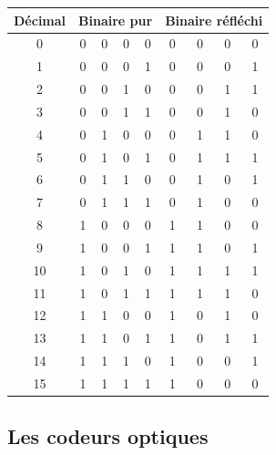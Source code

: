 \documentclass[10pt,fleqn]{article} %
\begin{document}
\begin{minipage}[c]{.4\linewidth}
\begin{center}
\begin{tabular}{|c|cccc|cccc|}
\hline
Décimal & \multicolumn{4}{c|}{Binaire pur} &\multicolumn{4}{c|}{Binaire réfléchi} \\
\hline
\hline
0 & 0 & 0 & 0 & 0 & 0 & 0 & 0 & 0 \\ \hline
1 & 0 & 0 & 0 & 1 & 0 & 0 & 0 & 1 \\ \hline\hline
2 & 0 & 0 & 1 & 0 & 0 & 0 & 1 & 1 \\ \hline
3 & 0 & 0 & 1 & 1 & 0 & 0 & 1 & 0 \\ \hline\hline
4 & 0 & 1 & 0 & 0 & 0 & 1 & 1 & 0 \\ \hline
5 & 0 & 1 & 0 & 1 & 0 & 1 & 1 & 1 \\ \hline
6 & 0 & 1 & 1 & 0 & 0 & 1 & 0 & 1 \\ \hline
7 & 0 & 1 & 1 & 1 & 0 & 1 & 0 & 0 \\ \hline\hline
8 & 1 & 0 & 0 & 0 & 1 & 1 & 0 & 0 \\ \hline
9 & 1 & 0 & 0 & 1 & 1 & 1 & 0 & 1 \\ \hline
10 & 1 & 0 & 1 & 0 & 1 & 1 & 1 & 1 \\ \hline
11 & 1 & 0 & 1 & 1 & 1 & 1 & 1 & 0 \\ \hline
12 & 1 & 1 & 0 & 0 & 1 & 0 & 1 & 0 \\ \hline
13 & 1 & 1 & 0 & 1 & 1 & 0 & 1 & 1 \\ \hline
14 & 1 & 1 & 1 & 0 & 1 & 0 & 0 & 1 \\ \hline
15 & 1 & 1 & 1 & 1 & 1 & 0 & 0 & 0 \\ \hline
\end{tabular}
\end{center}
\end{minipage}

\subsection{Les codeurs optiques}
\end{document}
